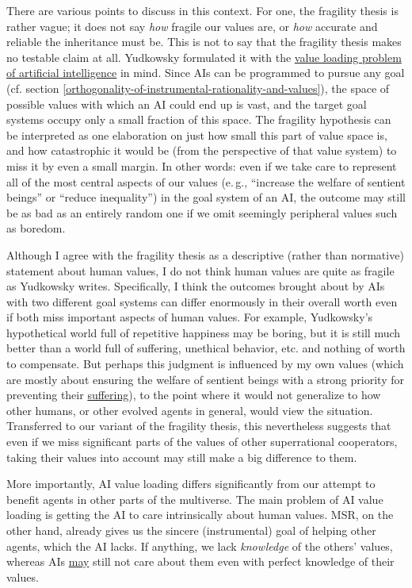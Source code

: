 There are various points to discuss in this context. For one, the
fragility thesis is rather vague; it does not say \emph{how} fragile our
values are, or \emph{how} accurate and reliable the inheritance must be.
This is not to say that the fragility thesis makes no testable claim at
all. Yudkowsky formulated it with the
\href{http://lesswrong.com/lw/llr/superintelligence_20_the_valueloading_problem/}{value
loading problem of artificial intelligence} in mind. Since AIs can be
programmed to pursue any goal (cf. section
\ref{orthogonality-of-instrumental-rationality-and-values}), the space of possible
values with which an AI could end up is vast, and the target goal
systems occupy only a small fraction of this space. The fragility
hypothesis can be interpreted as one elaboration on just how small this
part of value space is, and how catastrophic it would be (from the
perspective of that value system) to miss it by even a small margin. In
other words: even if we take care to represent all of the most central
aspects of our values (e.\,g., ``increase the welfare of sentient beings''
or ``reduce inequality'') in the goal system of an AI, the outcome may
still be as bad as an entirely random one if we omit seemingly
peripheral values such as boredom.

Although I agree with the fragility thesis as a descriptive (rather than
normative) statement about human values, I do not think human values are
quite as fragile as Yudkowsky writes. Specifically, I think the outcomes
brought about by AIs with two different goal systems can differ
enormously in their overall worth even if both miss important aspects of
human values. For example, Yudkowsky's hypothetical world full of
repetitive happiness may be boring, but it is still much better than a
world full of suffering, unethical behavior, etc. and nothing of worth
to compensate. But perhaps this judgment is influenced by my own values
(which are mostly about ensuring the welfare of sentient beings with a
strong priority for preventing their
\href{https://foundational-research.org/the-case-for-suffering-focused-ethics/}{suffering}),
to the point where it would not generalize to how other humans, or other
evolved agents in general, would view the situation. Transferred to our
variant of the fragility thesis, this nevertheless suggests that even if
we miss significant parts of the values of other superrational
cooperators, taking their values into account may still make a big
difference to them.

More importantly, AI value loading differs significantly from our
attempt to benefit agents in other parts of the multiverse. The main
problem of AI value loading is getting the AI to care intrinsically
about human values. MSR, on the other hand, already gives us the sincere
(instrumental) goal of helping other agents, which the AI lacks. If
anything, we lack \emph{knowledge} of the others' values, whereas AIs
\href{http://lesswrong.com/lw/igf/the_genie_knows_but_doesnt_care/}{may}
still not care about them even with perfect knowledge of their values.


